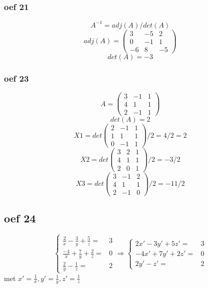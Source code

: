 \documentclass[10pt,a4paper]{article}
\begin{document}
\subsubsection*{oef 21}
\[A^{-1} = adj(A)/det(A)\]
\[adj(A) =
\begin{pmatrix}
3 & -5 & 2\\
0 & -1 & 1\\
-6 & 8 & -5
\end{pmatrix} 
\]
\[det(A)=-3\]

\subsubsection*{oef 23}
\[ A = 
\begin{pmatrix}
3 & -1 & 1\\
4 & 1 & 1\\
2 & -1 & 1
\end{pmatrix}
\]
\[ det(A) = 2\]
\[X1 = det 
\begin{pmatrix}
2 & -1 & 1\\
1 & 1 & 1\\
0 & -1 & 1
\end{pmatrix}
/2 = 4/2 = 2 \]
\[X2 = det
\begin{pmatrix}
3 & 2 & 1\\
4 & 1 & 1\\
2 & 0 & 1
\end{pmatrix}
/2 = -3/2 \]
\[X3 = det
\begin{pmatrix}
3 & -1 & 2\\
4 & 1 & 1\\
2 & -1 & 0
\end{pmatrix}
/2 = -11/2 \]

\subsection*{oef 24}
\[ \left\{
     \begin{array}{lr}
       \frac{2}{x}-\frac{3}{y}+\frac{5}{z} = & 3 \\
       \frac{-4}{x}+\frac{7}{y}+\frac{2}{z} = & 0 \\
       \frac{2}{y}-\frac{1}{z} = & 2
     \end{array}
   \right. \Rightarrow\left\{
     \begin{array}{lr}
       2x'-3y'+5z' = & 3 \\
       -4x'+7y'+2z' = & 0 \\
       2y'-z' = & 2
     \end{array}
   \right.
\]
met $x' = \frac{1}{x}, y' = \frac{1}{y}, z' = \frac{1}{z}$
\end{document}
